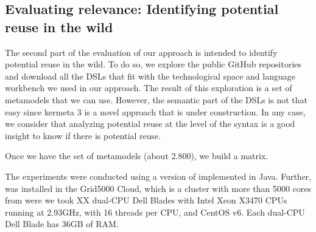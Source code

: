 \subsection{Evaluating relevance: Identifying potential reuse in the wild}

The second part of the evaluation of our approach is intended to identify potential reuse in the wild. To do so, we explore the public GitHub repositories and download all the DSLs that fit with the technological space and language workbench we used in our approach. The result of this exploration is a set of metamodels that we can use. However, the semantic part of the DSLs is not that easy since kermeta 3 is a novel approach that is under construction. In any case, we consider that analyzing potential reuse at the level of the syntax is a good insight to know if there is potential reuse.

Once we have the set of metamodels (about 2.800), we build a matrix. 

The experiments were conducted using a version of \toolname implemented in Java. Further, 
\toolname was installed in the Grid5000 Cloud, which is a cluster with more than 5000 cores from were we took XX dual-CPU Dell Blades with Intel Xeon X3470 CPUs running at 2.93GHz, with 16 threads 
per CPU, and CentOS v6. Each dual-CPU Dell Blade has 36GB of RAM. 



